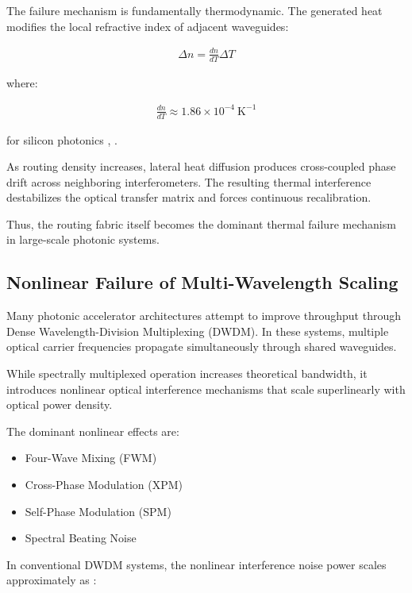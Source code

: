 \documentclass[journal]{IEEEtran}
\begin{document}
The failure mechanism is fundamentally thermodynamic. The generated heat modifies the local refractive index of adjacent waveguides:

\begin{align}
\Delta n = \frac{dn}{dT} \Delta T
\label{eq:thermal_index}
\end{align}

where:

\begin{align}
\frac{dn}{dT} \approx 1.86 \times 10^{-4}~\mathrm{K}^{-1}
\end{align}

for silicon photonics \cite{Saleh2019}, \cite{Incropera2006}.

As routing density increases, lateral heat diffusion produces cross-coupled phase drift across neighboring interferometers. The resulting thermal interference destabilizes the optical transfer matrix and forces continuous recalibration.

Thus, the routing fabric itself becomes the dominant thermal failure mechanism in large-scale photonic systems.

\subsection{\textbf{Nonlinear Failure of Multi-Wavelength Scaling}}

Many photonic accelerator architectures attempt to improve throughput through Dense Wavelength-Division Multiplexing (DWDM). In these systems, multiple optical carrier frequencies propagate simultaneously through shared waveguides.

While spectrally multiplexed operation increases theoretical bandwidth, it introduces nonlinear optical interference mechanisms that scale superlinearly with optical power density.

The dominant nonlinear effects are:

\begin{itemize}
\item Four-Wave Mixing (FWM)
\item Cross-Phase Modulation (XPM)
\item Self-Phase Modulation (SPM)
\item Spectral Beating Noise
\end{itemize}

In conventional DWDM systems, the nonlinear interference noise power scales approximately as \cite{Boyd2020,Cotter1999}:
\end{document}

